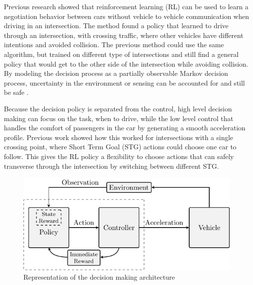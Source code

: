 Previous research \cite{Tram2018} showed that reinforcement learning (RL) can be used to learn a negotiation behavior between cars without vehicle to vehicle communication when driving in an intersection. The method found a policy that learned to drive through an intersection, with crossing traffic, where other vehicles have different intentions and avoided collision. The previous method could use the same algorithm, but trained on different type of intersections and still find a general policy that would get to the other side of the intersection while avoiding collision. 
By modeling the decision process as a partially observable Markov decision process, uncertainty in the environment or sensing can be accounted for \cite{BrechtelProbabilisticPOMDPs} and still be safe \cite{BoutonReinforcementDriving}. 

Because the decision policy is separated from the control, high level decision making can focus on the task, when to drive, while the low level control that handles the comfort of passengers in the car by generating a smooth acceleration profile. Previous work showed how this worked for intersections with a single crossing point, where Short Term Goal (STG) actions could choose one car to follow. This gives the RL policy a flexibility to choose actions that can safely transverse through the intersection by switching between different STG. %

\begin{figure}[t!]
	\centering
	\vspace{0.3cm}
	\includegraphics[width=0.8\columnwidth]{figures/figures-architecture.pdf}
	\caption{Representation of the decision making architecture}
	\label{fig:Architecture}
	\vspace{-0.3cm}
\end{figure}

